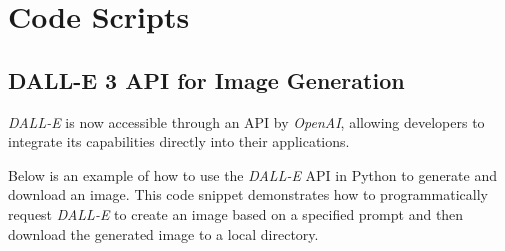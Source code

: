 \section{Code Scripts}
\label{appendix:code}


\subsection{DALL-E 3 API for Image Generation}

\textit{DALL-E} is now accessible through an API by \textit{OpenAI}, allowing developers to integrate its capabilities directly into their applications.

Below is an example of how to use the \textit{DALL-E} API in Python to generate and download an image. This code snippet demonstrates how to programmatically request \textit{DALL-E} to create an image based on a specified prompt and then download the generated image to a local directory.



